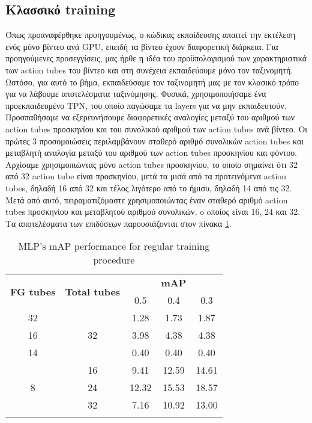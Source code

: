 \subsection{Κλασσικό \en training}
Όπως προαναφέρθηκε προηγουμένως, ο κώδικας εκπαίδευσης απαιτεί την εκτέλεση ενός μόνο βίντεο ανά \en GPU\gr, επειδή τα βίντεο έχουν διαφορετική διάρκεια.
Για προηγούμενες προσεγγίσεις, μας ήρθε η  ιδέα του προϋπολογισμού των χαρακτηριστικά των \en action tubes \gr του βίντεο και στη συνέχεια
εκπαιδεύουμε μόνο τον ταξινομητή. Ωστόσο, για αυτό το βήμα, εκπαιδεύσαμε τον ταξινομητή μας με τον κλασικό τρόπο για να λάβουμε
αποτελέσματα ταξινόμησης. Φυσικά, χρησιμοποιήσαμε ένα προεκπαιδευμένο \en TPN\gr, του οποίο παγώσαμε τα \en layers \gr για να μην εκπαιδευτούν.
Προσπαθήσαμε να εξερευνήσουμε διαφορετικές αναλογίες μεταξύ του αριθμού των \en action tubes \gr προσκηνίου και του συνολικού αριθμού των
\en action tubes \gr ανά βίντεο. Οι πρώτες 3 προσομοιώσεις περιλαμβάνουν σταθερό αριθμό συνολικών \en action tubes \gr και μεταβλητή αναλογία
μεταξύ του αριθμού των \en action tubes \gr προσκηνίου και φόντου. Αρχίσαμε χρησιμοπιώντας μόνο \en action tubes \gr προσκηνίου, το  οποίο
σημαίνει ότι 32 από 32 \en action tube  \gr είναι προσκηνίου, μετά τα μισά από τα προτεινόμενα  \en action tubes, \gr δηλαδή 16 από 32 και
τέλος λιγότερο από το ήμισυ, δηλαδή 14 από τις 32.
Μετά από αυτό, πειραματιζόμαστε χρησιμοποιώντας έναν σταθερό αριθμό \en action tubes \gr προσκηνίου και μεταβλητού αριθμού συνολικών, o oποίος είναι 16, 24 και 32. Τα αποτελέσματα των επιδόσεων παρουσιάζονται στον πίνακα \ref{table:gr_mlp_reg}.

\begin{center}
  \en
  \begin{longtable}{|| c | c || c c c ||}
    \hline
    \multirow{2}{*}{\textbf{FG tubes}} & \multirow{2}{*}{\textbf{Total tubes}} & {} &  \textbf{mAP} & {} \\
    {} & {} & 0.5 & 0.4 & 0.3 \\
    \hline
    32 & \multirow{3}{*}{32} &1.28 & 1.73 & 1.87  \\
    \cline{1-1} \cline{3-5}
    16 & {} & 3.98 & 4.38 & 4.38  \\
    \cline{1-1} \cline{3-5}
    14 & {} & 0.40 & 0.40 & 0.40 \\
    \hline
    \multirow{3}{*}{8} & 16 & 9.41 & 12.59 & 14.61 \\
    \cline{2-5}
    {} & 24 & 12.32 & 15.53 & 18.57 \\
    \cline{2-5}
    {} & 32 & 7.16 & 10.92 & 13.00 \\
    \hline
    \caption{MLP's mAP performance for regular training procedure}
    \label{table:gr_mlp_reg}
  \end{longtable}
\end{center}

